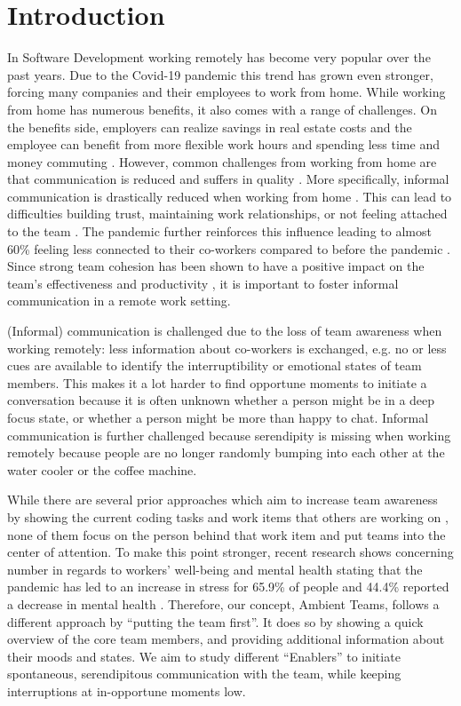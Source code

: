 \chapter{Introduction}
In Software Development working remotely has become very popular over the past years. Due to the  Covid-19 pandemic this trend has grown even stronger, forcing many companies and their employees to work from home. While working from home has numerous benefits, it also comes with a range of challenges. On the benefits side, employers can realize savings in real estate costs and the employee can benefit from more flexible work hours and spending less time and money commuting \cite{mulki2009set}. However, common challenges from working from home are that communication is reduced \cite{kraut1988patterns} and suffers in quality \cite{mulki2009set}. More specifically, informal communication is drastically reduced when working from home \cite{hinds2005understanding}. This can lead to difficulties building trust, maintaining work relationships, or not feeling attached to the team \cite{comella2020revisiting, olson2006bridging}. The pandemic further reinforces this influence leading to almost 60\% feeling less connected to their co-workers compared to before the pandemic \cite{msworkindexconnection}. Since strong team cohesion has been shown to have a positive impact on the team's effectiveness and productivity \cite{carlson2017virtual}, it is important to foster informal communication in a remote work setting.

(Informal) communication is challenged due to the loss of team awareness when working remotely: less information about co-workers is exchanged, e.g. no or less cues are available to identify the interruptibility or emotional states of team members. This makes it a lot harder to find opportune moments to initiate a conversation because it is often unknown whether a person might be in a deep focus state, or whether a person might be more than happy to chat. Informal communication is further challenged because serendipity is missing when working remotely because people are no longer randomly bumping into each other at the water cooler or the coffee machine.

While there are several prior approaches which aim to increase team awareness by showing the current coding tasks and work items that others are working on \cite{biehl2007fastdash, jakobsen2009wipdash}, none of them focus on the person behind that work item and put teams into the center of attention. To make this point stronger, recent research shows concerning number in regards to workers' well-being and mental health stating that the pandemic has led to an increase in stress for 65.9\% of people and 44.4\% reported a decrease in mental health \cite{qualtricksmental}. Therefore, our concept, Ambient Teams, follows a different approach by ``putting the team first''. It does so by showing a quick overview of the core team members, and providing additional information about their moods and states. We aim to study different ``Enablers'' to initiate spontaneous, serendipitous communication with the team, while keeping interruptions at in-opportune moments low.


